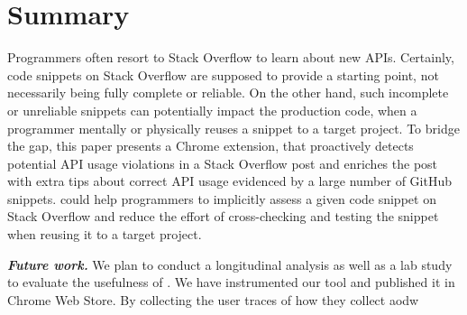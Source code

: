 \section{Summary}
\label{sec:summary}
Programmers often resort to Stack Overflow to learn about new APIs. Certainly, code snippets on Stack Overflow are supposed to provide a starting point, not necessarily being fully complete or reliable. On the other hand, such incomplete or unreliable snippets can potentially impact the production code, when a programmer mentally or physically reuses a snippet to a target project. 
To bridge the gap, this paper presents a Chrome extension, {\tool} that proactively detects potential API usage violations in a Stack Overflow post and enriches the post with extra tips about correct API usage evidenced by a large number of GitHub snippets. {\tool} could help programmers to implicitly assess a given code snippet on Stack Overflow and reduce the effort of cross-checking and testing the snippet when reusing it to a target project. 

{\bf\em Future work.} We plan to conduct a longitudinal analysis as well as a lab study to evaluate the usefulness of {\tool}. We have instrumented our tool and published it in Chrome Web Store. By collecting the user traces of how they collect aodw 